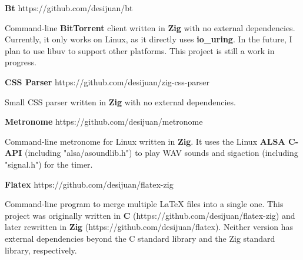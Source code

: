 \documentclass[12pt, a4paper]{article}
\newcommand{\github}{https://github.com/desijuan}
\begin{document}
\begin{multicols*}{2}
\vspace{\espacio}
\textbf{\color{teal}\large Bt} \github/bt\par
Command-line \textbf{BitTorrent} client written in \textbf{Zig} with no external dependencies. Currently, it only works on Linux,
as it directly uses \textbf{io\_uring}. In the future, I plan to use libuv to support other platforms. This project is still
a work in progress.

\vspace{\espacio}
\textbf{\color{teal}\large CSS Parser} \github/zig-css-parser \par
Small CSS parser written in \textbf{Zig} with no external dependencies.

\vspace{\espacio}
\textbf{\color{teal}\large Metronome} \github/metronome \par
Command-line metronome for Linux written in \textbf{Zig}. It uses the Linux \textbf{ALSA C-API} (including "alsa/asoundlib.h")
to play WAV sounds and sigaction (including "signal.h") for the timer.

\vspace{\espacio}
\textbf{\color{teal}\large Flatex} \github/flatex-zig \par
Command-line program to merge multiple LaTeX files into a single one. This project was originally written in \textbf{C} (\github/flatex-zig) and
later rewritten in \textbf{Zig} (\github/flatex). Neither version has external dependencies beyond the C standard library and the Zig standard
library, respectively.

\end{multicols*}
\end{document}
